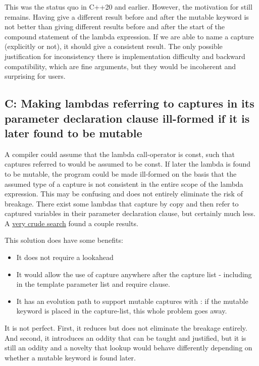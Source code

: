 \documentclass{wg21}
\begin{document}
This was the status quo in C++20 and earlier.
However, the motivation for  still remains. Having  give a different result before and after the mutable keyword is not better than giving different results before and after the start of the compound statement of the lambda expression.
If we are able to name a capture (explicitly or not), it should give a consistent result.
The only possible justification for inconsistency there is implementation difficulty and backward compatibility, which are fine arguments, but they would be incoherent and surprising for users.

\subsection{C: Making lambdas referring to captures in its parameter declaration clause ill-formed if it is later found to be mutable}

A compiler could assume that the lambda call-operator is const, such that captures referred to would be assumed to be const.
If later the lambda is found to be mutable, the program could be made ill-formed on the basis that the assumed type of a capture is not consistent in the entire scope of the lambda expression.
This may be confusing and does not entirely eliminate the risk of breakage.
There exist some  lambdas that capture by copy and then refer to captured variables in their parameter declaration clause, but certainly much less.
A \href{https://sourcegraph.com/search?q=context:global+\%5C\%5B.\%2B\%5C\%5D\%5C\%28.*decltype.*\%5C\%29+mutable+lang:c\%2B\%2B++count:2000\&patternType=regexp}{very crude search} found a couple results.

This solution does have some benefits:
\begin{itemize}
    \item It does not require a lookahead
    \item It would allow the use of capture anywhere after the capture list - including in the template parameter list and require clause.
    \item It has an evolution path to support mutable captures with : if the mutable keyword is placed in the capture-list, this whole problem goes away.
\end{itemize}

It is not perfect. First, it reduces but does not eliminate the breakage entirely. And second, it introduces an oddity that can be taught and justified, but it is still an oddity and a novelty that lookup would behave differently depending on whether a mutable keyword is found later.
\end{document}
